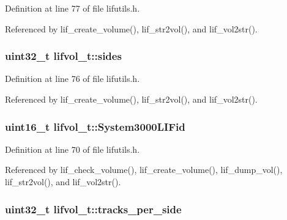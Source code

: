 Definition at line 77 of file lifutils.\+h.



Referenced by lif\+\_\+create\+\_\+volume(), lif\+\_\+str2vol(), and lif\+\_\+vol2str().

\subsubsection[{\texorpdfstring{sides}{sides}}]{\setlength{\rightskip}{0pt plus 5cm}uint32\+\_\+t lifvol\+\_\+t\+::sides}\hypertarget{structlifvol__t_a5b8ecfb441b010f69cb90b923cc50719}{}\label{structlifvol__t_a5b8ecfb441b010f69cb90b923cc50719}


Definition at line 76 of file lifutils.\+h.



Referenced by lif\+\_\+create\+\_\+volume(), lif\+\_\+str2vol(), and lif\+\_\+vol2str().

\subsubsection[{\texorpdfstring{System3000\+L\+I\+Fid}{System3000LIFid}}]{\setlength{\rightskip}{0pt plus 5cm}uint16\+\_\+t lifvol\+\_\+t\+::\+System3000\+L\+I\+Fid}\hypertarget{structlifvol__t_a98097f8c951448cbab6019b7b703e4d0}{}\label{structlifvol__t_a98097f8c951448cbab6019b7b703e4d0}


Definition at line 70 of file lifutils.\+h.



Referenced by lif\+\_\+check\+\_\+volume(), lif\+\_\+create\+\_\+volume(), lif\+\_\+dump\+\_\+vol(), lif\+\_\+str2vol(), and lif\+\_\+vol2str().

\subsubsection[{\texorpdfstring{tracks\+\_\+per\+\_\+side}{tracks_per_side}}]{\setlength{\rightskip}{0pt plus 5cm}uint32\+\_\+t lifvol\+\_\+t\+::tracks\+\_\+per\+\_\+side}\hypertarget{structlifvol__t_aae9e5135f98b80312eb785ac3747fc31}{}\label{structlifvol__t_aae9e5135f98b80312eb785ac3747fc31}


